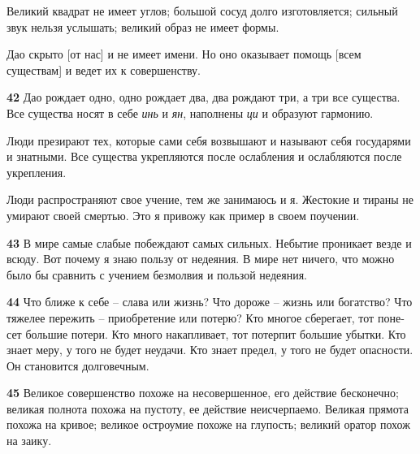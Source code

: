 \documentclass[a4paper]{article}
\begin{document}
{
Великий квадрат не имеет углов; большой сосуд долго изготовляется; сильный звук нельзя услышать; великий образ не имеет
формы.}

{
Дао скрыто [от нас] и не имеет имени. Но оно оказывает помощь [всем существам] и ведет их к совершенству.}

{\ttfamily
\foreignlanguage{russian}{\textrm{\textbf{42}}}\foreignlanguage{russian}{\textrm{ Дао рождает одно, одно рождает два,
два рождают три, а три все существа. Все существа носят в себе
}}\foreignlanguage{russian}{\textrm{\textit{инь}}}\foreignlanguage{russian}{\textrm{ и
}}\foreignlanguage{russian}{\textrm{\textit{ян}}}\foreignlanguage{russian}{\textrm{, наполнены
}}\foreignlanguage{russian}{\textrm{\textit{ци}}}\foreignlanguage{russian}{\textrm{ и образуют гармонию.}}}

{
Люди презирают тех, которые сами себя возвышают и называют себя государями и знатными. Все существа укрепляются после
ослабления и ослабляются после укрепления.}

{
Люди распространяют свое учение, тем же занимаюсь и я. Жестокие и тираны не умирают своей смертью. Это я привожу как
пример в своем поучении.}


\bigskip

{\ttfamily
\foreignlanguage{russian}{\textrm{\textbf{43}}}\foreignlanguage{russian}{\textrm{ В мире самые слабые побеждают самых
сильных. Небытие проникает везде и всюду. Вот почему я знаю пользу от недеяния. В мире нет ничего, что можно было бы
сравнить с учением безмолвия и пользой недеяния.}}}

{\ttfamily
\foreignlanguage{russian}{\textrm{\textbf{44}}}\foreignlanguage{russian}{\textrm{ Что ближе к себе – слава или жизнь?
Что дороже – жизнь или богатство? Что тяжелее пережить – приобретение или потерю? Кто многое сберегает, тот понесет
большие потери. Кто много накапливает, тот потерпит большие убытки. Кто знает меру, у того не будет неудачи. Кто знает
предел, у того не }}\foreignlanguage{russian}{\textrm{будет опасности. Он становится долговечным.}}}

{\ttfamily
\foreignlanguage{russian}{\textrm{\textbf{45}}}\foreignlanguage{russian}{\textrm{ Великое совершенство похоже на
несовершенное, его действие бесконечно; великая полнота похожа на пустоту, ее действие неисчерпаемо. Великая прямота
похожа на кривое; великое остроумие похоже на глупость; великий оратор похож на заику.}}}
\end{document}
